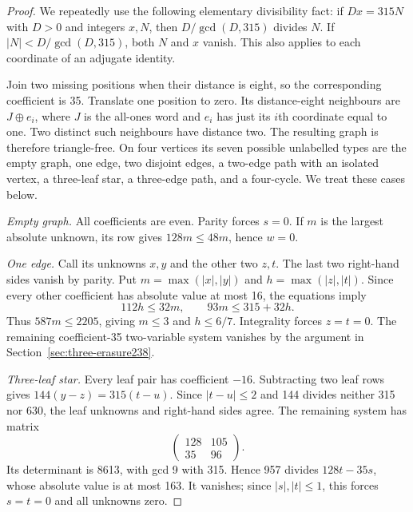 \begin{proof}
We repeatedly use the following elementary divisibility fact:
if $Dx=315N$ with $D>0$ and integers $x,N$, then
$D/\gcd(D,315)$ divides $N$. If $|N|<D/\gcd(D,315)$, both $N$ and $x$
vanish. This also applies to each coordinate of an adjugate identity.

Join two missing positions when their distance is eight, so the
corresponding coefficient is 35. Translate one position to zero.
Its distance-eight neighbours are $J\oplus e_i$, where $J$ is the
all-ones word and $e_i$ has just its $i$th coordinate equal to one.
Two distinct such neighbours have distance two. The resulting graph
is therefore triangle-free. On four vertices its seven possible
unlabelled types are the empty graph, one edge, two disjoint edges,
a two-edge path with an isolated vertex, a three-leaf star, a
three-edge path, and a four-cycle. We treat these cases below.

\smallskip\noindent\emph{Empty graph.}
All coefficients are even. Parity forces $s=0$. If $m$ is the largest
absolute unknown, its row gives $128m\le48m$, hence $w=0$.

\smallskip\noindent\emph{One edge.}
Call its unknowns $x,y$ and the other two $z,t$. The last two right-hand
sides vanish by parity. Put $m=\max(|x|,|y|)$ and
$h=\max(|z|,|t|)$. Since every other coefficient has absolute value at
most 16, the equations imply
\[
112h\le32m,\qquad93m\le315+32h.
\]
Thus $587m\le2205$, giving $m\le3$ and $h\le6/7$. Integrality forces
$z=t=0$. The remaining coefficient-35 two-variable system vanishes by
the argument in Section~\ref{sec:three-erasure238}.

\smallskip\noindent\emph{Three-leaf star.}
Every leaf pair has coefficient $-16$. Subtracting two leaf rows gives
$144(y-z)=315(t-u)$. Since $|t-u|\le2$ and 144 divides neither 315 nor
630, the leaf unknowns and right-hand sides agree. The remaining
system has matrix
\[
\begin{pmatrix}128&105\\35&96\end{pmatrix}.
\]
Its determinant is 8613, with gcd 9 with 315. Hence 957 divides
$128t-35s$, whose absolute value is at most 163. It vanishes; since
$|s|,|t|\le1$, this forces $s=t=0$ and all unknowns zero.


\end{proof}
